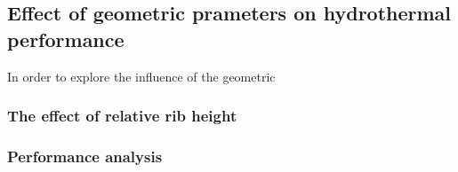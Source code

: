 \subsection{Effect of geometric prameters on hydrothermal performance}

In order to explore the influence of the geometric




\subsubsection{The effect of relative rib height}

\subsubsection{Performance analysis}



